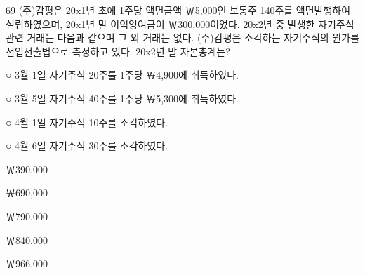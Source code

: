 \begin{question}{69}
(주)감평은 20x1년 초에 1주당 액면금액 ￦5,000인 보통주 140주를 액면발행하여 설립하였으며, 20x1년 말 이익잉여금이 ￦300,000이었다. 20x2년 중 발생한 자기주식 관련 거래는 다음과 같으며 그 외 거래는 없다. (주)감평은 소각하는 자기주식의 원가를 선입선출법으로 측정하고 있다. 20x2년 말 자본총계는?
\begin{framedtext}
○ 3월 1일 자기주식 20주를 1주당 ￦4,900에 취득하였다. \par
○ 3월 5일 자기주식 40주를 1주당 ￦5,300에 취득하였다. \par
○ 4월 1일 자기주식 10주를 소각하였다. \par
○ 4월 6일 자기주식 30주를 소각하였다.
\end{framedtext}
\begin{choices}
  \item ￦390,000
  \item ￦690,000
  \item ￦790,000
  \item ￦840,000
  \item ￦966,000
\end{choices}
\end{question}
